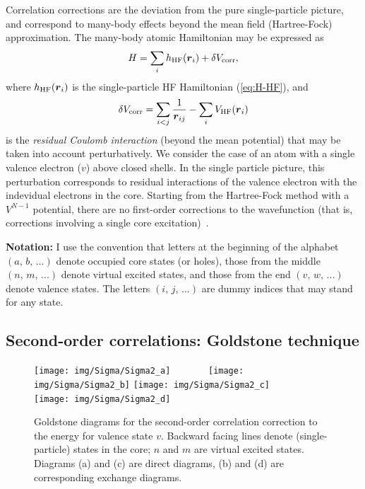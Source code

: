 \documentclass[10pt,twocolumn,a4paper]{article}%
\renewcommand{\v}[1]{\ensuremath{\boldsymbol{#1}}}		%
\newcommand{\be}{\begin{equation}}
\newcommand{\ee}{\end{equation}}
\begin{document}
Correlation corrections are the deviation from the pure single-particle picture, and correspond to many-body effects beyond the mean field (Hartree-Fock) approximation.
The many-body atomic Hamiltonian may be expressed as
\be
H = \sum_i h_{\rm HF}(\v{r}_i) + \delta V_{\rm corr},
\ee
where $h_{\rm HF}(\v{r}_i)$ is the single-particle HF Hamiltonian (\ref{eq:H-HF}), and
\be\label{eq:residCoul}
\delta V_{\rm corr} = \sum_{i<j}\frac{1}{\v{r}_{ij}} - \sum_iV_{\rm HF}(\v{r}_i)
\ee
is the {\em residual Coulomb interaction} (beyond the mean potential) that may be taken into account perturbatively.
We consider the case of an atom with a single valence electron ($v$) above closed shells.
In the single particle picture, this perturbation corresponds to residual interactions of the valence electron with the indevidual electrons in the core.
Starting from the Hartree-Fock method with a $V^{N-1}$ potential, there are no first-order corrections to the wavefunction (that is, corrections involving a single core excitation)~\cite{Lindgren1986}.


{\bf Notation:} I use the convention that letters at the beginning of the alphabet {${(a,\,b,\,...)}$} denote occupied core states (or holes),
those from the middle {${(n,\,m,\,...)}$} denote virtual excited states, and
those from the end {${(v,\,w,\,...)}$} denote valence states.
The letters {${(i,\,j,\,...)}$} are dummy indices that may stand for any state.



\subsection{Second-order correlations: Goldstone technique}

\begin{figure}%
\centering\tiny
\texttt{[image: img/Sigma/Sigma2\_a]}~~~~~~~
\texttt{[image: img/Sigma/Sigma2\_b]}
\texttt{[image: img/Sigma/Sigma2\_c]}~~~~~~~
\texttt{[image: img/Sigma/Sigma2\_d]}
\caption{\small Goldstone diagrams for the second-order correlation correction to the energy for valence state $v$. Backward facing lines denote (single-particle) states in the core; $n$ and $m$ are virtual excited states. Diagrams (a) and (c) are direct diagrams, (b) and (d) are corresponding exchange diagrams.\label{fig:Sigma2}}
\end{figure}
\end{document}
